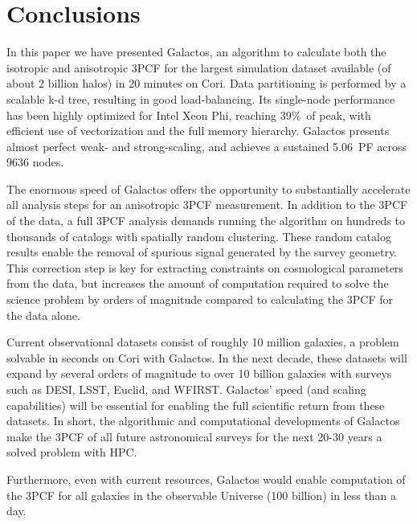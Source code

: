 \section{Conclusions}
In this paper we have presented Galactos, an algorithm to calculate both the isotropic and anisotropic 3PCF for the largest simulation dataset available (of about 2 billion halos) in 20 minutes on Cori. 
Data partitioning is performed by a scalable k-d tree, resulting in good load-balancing. 
Its single-node performance has been highly optimized for Intel Xeon Phi, reaching 39\%\ of peak, with efficient use of vectorization and the full memory hierarchy. 
Galactos presents almost perfect weak- and strong-scaling, and achieves a sustained 5.06~PF across 9636 nodes. 


The enormous speed of Galactos offers the opportunity to substantially accelerate all analysis steps for an anisotropic 3PCF measurement. In addition to the 3PCF of the data, a full 3PCF analysis demands running the algorithm on hundreds to thousands of catalogs with spatially random clustering. These random catalog results enable the removal of spurious signal generated by the survey geometry. 
This correction step is key for extracting constraints on cosmological parameters from the data, but increases the amount of computation required to solve the science problem by orders of magnitude compared to calculating the 3PCF for the data alone. 

Current observational datasets consist of roughly 10 million galaxies, a problem solvable in seconds on Cori with Galactos. In the next decade, these datasets will expand by several orders of magnitude to over 10 billion galaxies with surveys such as DESI, LSST, Euclid, and WFIRST. Galactos' speed (and scaling capabilities) will be essential for enabling the full scientific return from these datasets. 
In short, the algorithmic and computational developments of Galactos make the 3PCF of all future astronomical surveys for the next 20-30 years a solved problem with HPC. 

Furthermore, even with current resources, Galactos would enable computation of the 3PCF for all galaxies in the observable Universe (100 billion) in less than a day.


